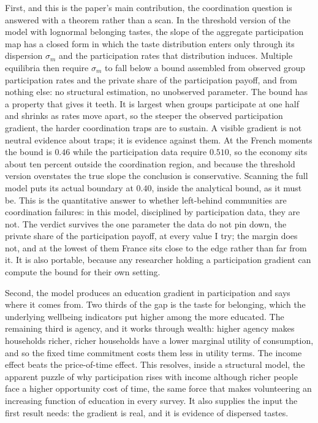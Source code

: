\documentclass[11pt]{article}
\begin{document}
First, and this is the paper's main contribution, the coordination question is answered with a theorem rather than a scan. In the threshold version of the model with lognormal belonging tastes, the slope of the aggregate participation map has a closed form in which the taste distribution enters only through its dispersion $\sigma_m$ and the participation rates that distribution induces. Multiple equilibria then require $\sigma_m$ to fall below a bound assembled from observed group participation rates and the private share of the participation payoff, and from nothing else: no structural estimation, no unobserved parameter. The bound has a property that gives it teeth. It is largest when groups participate at one half and shrinks as rates move apart, so the steeper the observed participation gradient, the harder coordination traps are to sustain. A visible gradient is not neutral evidence about traps; it is evidence against them. At the French moments the bound is $0.46$ while the participation data require $0.510$, so the economy sits about ten percent outside the coordination region, and because the threshold version overstates the true slope the conclusion is conservative. Scanning the full model puts its actual boundary at $0.40$, inside the analytical bound, as it must be. This is the quantitative answer to whether left-behind communities are coordination failures: in this model, disciplined by participation data, they are not. The verdict survives the one parameter the data do not pin down, the private share of the participation payoff, at every value I try; the margin does not, and at the lowest of them France sits close to the edge rather than far from it. It is also portable, because any researcher holding a participation gradient can compute the bound for their own setting.

Second, the model produces an education gradient in participation and says where it comes from. Two thirds of the gap is the taste for belonging, which the underlying wellbeing indicators put higher among the more educated. The remaining third is agency, and it works through wealth: higher agency makes households richer, richer households have a lower marginal utility of consumption, and so the fixed time commitment costs them less in utility terms. The income effect beats the price-of-time effect. This resolves, inside a structural model, the apparent puzzle of why participation rises with income although richer people face a higher opportunity cost of time, the same force that makes volunteering an increasing function of education in every survey. It also supplies the input the first result needs: the gradient is real, and it is evidence of dispersed tastes.
\end{document}
